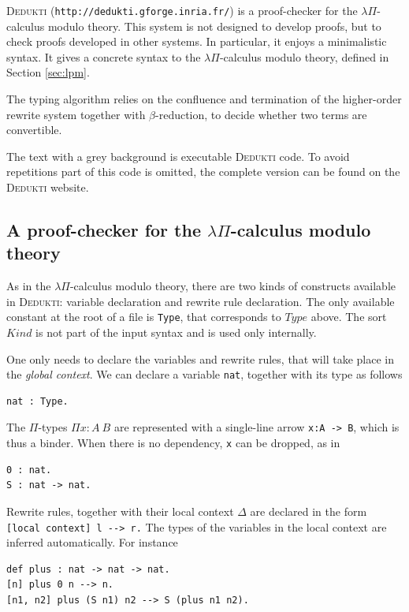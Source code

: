 \documentclass[english]{lipics}
\newcommand\lst[1]{{\rm \lstinline{#1}}}
\begin{document}
\textsc{Dedukti} ({\tt http://dedukti.gforge.inria.fr/})
is a proof-checker for the $\lambda \Pi$-calculus
modulo theory. This system is not designed to develop proofs, but to
check proofs developed in other systems. In particular, it enjoys a
minimalistic syntax. It gives a concrete syntax to the $\lambda
\Pi$-calculus modulo theory, defined in Section \ref{sec:lpm}.

The typing algorithm relies on the confluence and termination of the
higher-order rewrite system together with $\beta$-reduction, to decide
whether two terms are convertible.

The text with a grey background is
executable \textsc{Dedukti} code. To avoid repetitions part of this
code is omitted, the complete version can be found on the
\textsc{Dedukti} website.

\subsection{A proof-checker for the  $\lambda \Pi$-calculus modulo
theory}

As in the $\lambda \Pi$-calculus modulo theory, there are two kinds of
constructs available in \textsc{Dedukti}:
variable declaration and rewrite rule declaration.  The only
available constant at the root of a file is \lst{Type}, that
corresponds to $Type$ above. The sort $Kind$ is not part of the input
syntax and is used only internally.

One only needs to declare the variables and rewrite rules, that will take
place in the \emph{global context}.
We can declare a variable \lst{nat}, together with
its type as follows
\begin{lstlisting}
nat : Type.
\end{lstlisting}

The $\Pi$-types $\Pi x: A~B$ are represented with a single-line arrow
\lst{x:A -> B}, which is thus a binder. When there is no dependency,
\lst{x} can be dropped, as in
\begin{lstlisting}
0 : nat.
S : nat -> nat.
\end{lstlisting}

Rewrite rules, together with their local context $\Delta$ are
declared in the form
\linebreak
\lst{[local context] l --> r.}
The types of the variables in the local context are inferred automatically. For instance
\begin{lstlisting}
def plus : nat -> nat -> nat.
[n] plus 0 n --> n.
[n1, n2] plus (S n1) n2 --> S (plus n1 n2).
\end{lstlisting}
\end{document}

